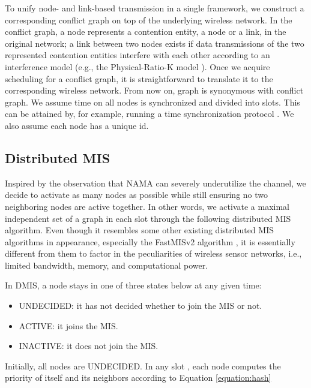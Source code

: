 \documentclass[conference]{IEEEtran}
\begin{document}
To unify node- and link-based transmission in a single framework, we construct a corresponding conflict graph on top of the underlying wireless network. In the conflict graph, a node represents a contention entity, a node or a link, in the original network; a link between two nodes exists if data transmissions of the two represented contention entities interfere with each other according to an interference model (e.g., the Physical-Ratio-K model \cite{prk:zhang:secon10}). Once we acquire scheduling for a conflict graph, it is straightforward to translate it to the corresponding wireless network. From now on, graph is synonymous with conflict graph. We assume time on all nodes is synchronized and divided into slots. This can be attained by, for example, running a time synchronization protocol \cite{prks:zhang:tr}. We also assume each node has a unique id. 

\subsection{Distributed MIS}
Inspired by the observation that NAMA can severely underutilize the channel, we decide to activate as many nodes as possible while still ensuring no two neighboring nodes are active together. In other words, we activate a maximal independent set of a graph in each slot through the following distributed MIS algorithm.
Even though it resembles some other existing distributed MIS algorithms in appearance, especially the FastMISv2 algorithm \cite{fastmisv2}, it is essentially different from them to factor in the peculiarities of wireless sensor networks, i.e., limited bandwidth, memory, and computational power.

In DMIS, a node stays in one of three states below at any given time: 
\begin{itemize}
	\item	UNDECIDED:  	it has not decided whether to join the MIS or not.
	\item	ACTIVE: 		it joins the MIS.
	\item	INACTIVE: 	it does not join the MIS.
\end{itemize}
Initially, all nodes are UNDECIDED. In any slot , each node computes the priority of itself and its neighbors according to Equation \ref{equation:hash}
\end{document}
